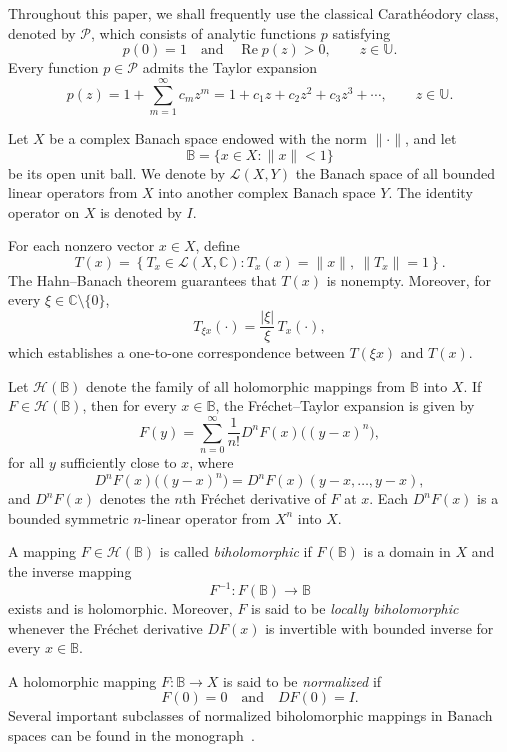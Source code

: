 \documentclass[11pt, reqno]{amsart}
\numberwithin{equation}{section}
\begin{document}
Throughout this paper, we shall frequently use the classical Carath\'eodory class, denoted by $\mathcal{P}$, which consists of analytic functions $p$ satisfying
\[
p(0)=1
\quad\text{and}\quad
\operatorname{Re}p(z)>0,\qquad z\in\mathbb{U}.
\]
Every function $p\in\mathcal{P}$ admits the Taylor expansion
\begin{equation}\label{eq:P}
p(z)=1+\sum_{m=1}^{\infty}c_mz^m
=1+c_1z+c_2z^2+c_3z^3+\cdots,
\qquad z\in\mathbb{U}.
\end{equation}

Let $X$ be a complex Banach space endowed with the norm $\|\cdot\|$, and let
\[
\mathbb{B}=\{x\in X:\|x\|<1\}
\]
be its open unit ball. We denote by $\mathcal{L}(X,Y)$ the Banach space of all bounded linear operators from $X$ into another complex Banach space $Y$. The identity operator on $X$ is denoted by $I$.

For each nonzero vector $x\in X$, define
\[
T(x)=
\left\{
T_x\in\mathcal{L}(X,\mathbb{C}):
T_x(x)=\|x\|,
\ \|T_x\|=1
\right\}.
\]
The Hahn--Banach theorem guarantees that $T(x)$ is nonempty. Moreover, for every $\xi\in\mathbb{C}\setminus\{0\}$,
\[
T_{\xi x}(\cdot)=\frac{|\xi|}{\xi}\,T_x(\cdot),
\]
which establishes a one-to-one correspondence between $T(\xi x)$ and $T(x)$.

Let $\mathcal{H}(\mathbb{B})$ denote the family of all holomorphic mappings from $\mathbb{B}$ into $X$. If $F\in\mathcal{H}(\mathbb{B})$, then for every $x\in \mathbb{B}$, the Fr\'echet--Taylor expansion is given by
\[
F(y)
=
\sum_{n=0}^{\infty}
\frac{1}{n!}
D^nF(x)\bigl((y-x)^n\bigr),
\]
for all $y$ sufficiently close to $x$, where
\[
D^nF(x)\bigl((y-x)^n\bigr)
=
D^nF(x)(y-x,\ldots,y-x),
\]
and $D^nF(x)$ denotes the $n$th Fr\'echet derivative of $F$ at $x$. Each $D^nF(x)$ is a bounded symmetric $n$-linear operator from $X^n$ into $X$.

A mapping $F\in\mathcal{H}(\mathbb{B})$ is called \emph{biholomorphic} if $F(\mathbb{B})$ is a domain in $X$ and the inverse mapping
\[
F^{-1}:F(\mathbb{B})\rightarrow \mathbb{B}
\]
exists and is holomorphic. Moreover, $F$ is said to be \emph{locally biholomorphic} whenever the Fr\'echet derivative $DF(x)$ is invertible with bounded inverse for every $x\in \mathbb{B}$.

A holomorphic mapping $F:\mathbb{B}\rightarrow X$ is said to be \emph{normalized} if
\[
F(0)=0
\quad\text{and}\quad
DF(0)=I.
\]
Several important subclasses of normalized biholomorphic mappings in Banach spaces can be found in the monograph~\cite{GK2003}.
\end{document}

